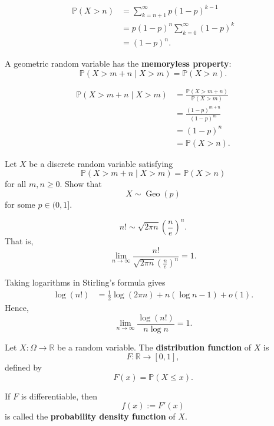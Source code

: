 \begin{proofenv}
\[
\begin{aligned}
    \mathbb{P}(X>n)
    &=
    \sum_{k=n+1}^{\infty}
    p(1-p)^{k-1} \\
    &=
    p(1-p)^n
    \sum_{k=0}^{\infty}(1-p)^k \\
    &=
    (1-p)^n.
\end{aligned}
\]
\end{proofenv}

\begin{propositionenv}
A geometric random variable has the \textbf{memoryless property}:
\[
    \mathbb{P}(X>m+n\mid X>m)
    =
    \mathbb{P}(X>n).
\]
\end{propositionenv}

\begin{proofenv}
\[
\begin{aligned}
    \mathbb{P}(X>m+n\mid X>m)
    &=
    \frac{\mathbb{P}(X>m+n)}
         {\mathbb{P}(X>m)} \\
    &=
    \frac{(1-p)^{m+n}}{(1-p)^m} \\
    &=
    (1-p)^n \\
    &=
    \mathbb{P}(X>n).
\end{aligned}
\]
\end{proofenv}

\begin{exerciseenv}
Let $X$ be a discrete random variable satisfying
\[
    \mathbb{P}(X>m+n\mid X>m)
    =
    \mathbb{P}(X>n)
\]
for all $m,n\ge0$. Show that
\[
    X\sim\operatorname{Geo}(p)
\]
for some $p\in(0,1]$.
\end{exerciseenv}

\begin{remark}
\[
    n!
    \sim
    \sqrt{2\pi n}
    \left(\frac ne\right)^n.
\]
That is,
\[
    \lim_{n\to\infty}
    \frac{n!}
    {\sqrt{2\pi n}\left(\frac ne\right)^n}
    =1.
\]

Taking logarithms in Stirling's formula gives
\[
\begin{aligned}
    \log(n!)
    &=
    \frac12\log(2\pi n)
    +n(\log n-1)
    +o(1).
\end{aligned}
\]
Hence,
\[
    \lim_{n\to\infty}
    \frac{\log(n!)}{n\log n}
    =1.
\]
\end{remark}

\begin{definitionenv}
Let $X:\Omega\to\mathbb R$ be a random variable. The
\textbf{distribution function} of $X$ is
\[
    F:\mathbb R\to[0,1],
\]
defined by
\[
    F(x)=\mathbb P(X\le x).
\]

If $F$ is differentiable, then
\[
    f(x):=F'(x)
\]
is called the \textbf{probability density function} of $X$.
\end{definitionenv}

